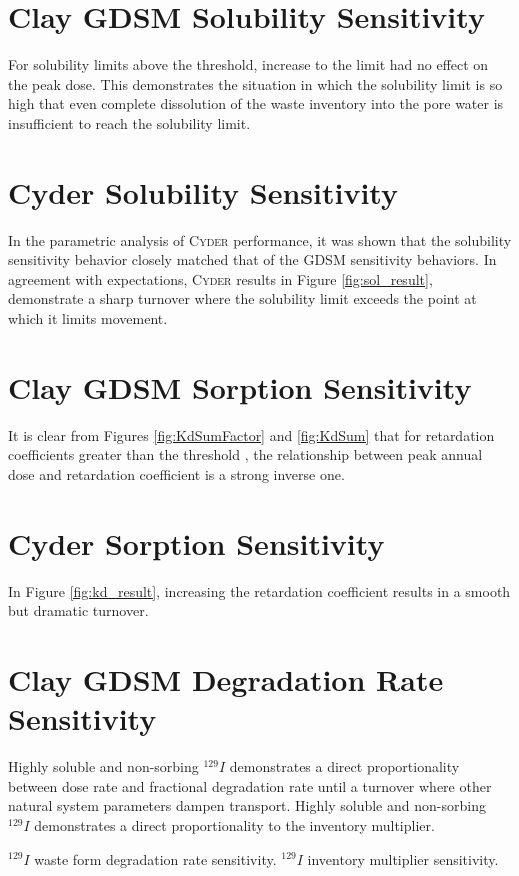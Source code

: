 \documentclass[letterpaper]{article}
\newcommand{\Cyder}{\textsc{Cyder}\xspace}
\begin{document}
{\section{Clay GDSM Solubility Sensitivity}
For solubility limits above the threshold, increase to the limit had no effect on the peak dose. This demonstrates the 
situation in which the solubility limit is so high that even complete 
dissolution of the waste inventory into the pore water is insufficient to reach 
the solubility limit.

\section{Cyder Solubility Sensitivity}
In the parametric analysis of \Cyder performance, it was shown that the 
solubility sensitivity behavior closely matched that of the GDSM 
sensitivity behaviors. In agreement with expectations, \Cyder results in Figure 
\ref{fig:sol_result}, demonstrate a sharp turnover 
where the solubility limit exceeds the point at which it limits movement. 

\section{Clay GDSM Sorption Sensitivity}
It is clear from Figures \ref{fig:KdSumFactor} and \ref{fig:KdSum} that 
for retardation coefficients greater than the threshold , the 
relationship between peak annual dose and retardation coefficient is a strong 
inverse one. 
\section{Cyder Sorption Sensitivity}

In Figure \ref{fig:kd_result}, increasing the retardation 
coefficient results in a smooth but dramatic turnover. 


\section{Clay GDSM Degradation Rate Sensitivity}

Highly soluble and non-sorbing $^{129}I$ demonstrates a direct proportionality between dose rate and 
fractional degradation rate until a turnover where other natural system 
parameters dampen transport. Highly soluble and non-sorbing $^{129}I$ demonstrates a direct 
proportionality to the inventory multiplier.

$^{129}I$ waste form degradation rate sensitivity.
$^{129}I$ inventory multiplier sensitivity.


}
\end{document}
